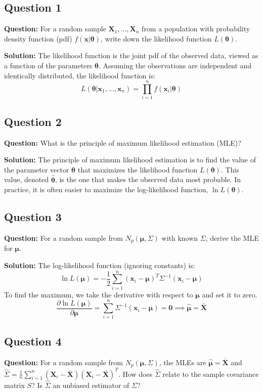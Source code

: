 \subsection*{Question 1}
\textbf{Question:} For a random sample $\mathbf{X}_1, \dots, \mathbf{X}_n$ from a population with probability density function (pdf) $f(\mathbf{x} | \boldsymbol{\theta})$, write down the likelihood function $L(\boldsymbol{\theta})$.

\textbf{Solution:}
The likelihood function is the joint pdf of the observed data, viewed as a function of the parameters $\boldsymbol{\theta}$. Assuming the observations are independent and identically distributed, the likelihood function is:
$$ L(\boldsymbol{\theta} | \mathbf{x}_1, \dots, \mathbf{x}_n) = \prod_{i=1}^n f(\mathbf{x}_i | \boldsymbol{\theta}) $$

\subsection*{Question 2}
\textbf{Question:} What is the principle of maximum likelihood estimation (MLE)?

\textbf{Solution:}
The principle of maximum likelihood estimation is to find the value of the parameter vector $\boldsymbol{\theta}$ that maximizes the likelihood function $L(\boldsymbol{\theta})$. This value, denoted $\hat{\boldsymbol{\theta}}$, is the one that makes the observed data most probable. In practice, it is often easier to maximize the log-likelihood function, $\ln L(\boldsymbol{\theta})$.

\subsection*{Question 3}
\textbf{Question:} For a random sample from $N_p(\boldsymbol{\mu}, \Sigma)$ with known $\Sigma$, derive the MLE for $\boldsymbol{\mu}$.

\textbf{Solution:}
The log-likelihood function (ignoring constants) is:
$$ \ln L(\boldsymbol{\mu}) = -\frac{1}{2} \sum_{i=1}^n (\mathbf{x}_i - \boldsymbol{\mu})^T \Sigma^{-1} (\mathbf{x}_i - \boldsymbol{\mu}) $$
To find the maximum, we take the derivative with respect to $\boldsymbol{\mu}$ and set it to zero.
$$ \frac{\partial \ln L(\boldsymbol{\mu})}{\partial \boldsymbol{\mu}} = \sum_{i=1}^n \Sigma^{-1}(\mathbf{x}_i - \boldsymbol{\mu}) = \mathbf{0} \implies \hat{\boldsymbol{\mu}} = \bar{\mathbf{X}} $$

\subsection*{Question 4}
\textbf{Question:} For a random sample from $N_p(\boldsymbol{\mu}, \Sigma)$, the MLEs are $\hat{\boldsymbol{\mu}} = \bar{\mathbf{X}}$ and $\hat{\Sigma} = \frac{1}{n}\sum_{i=1}^n(\mathbf{X}_i-\bar{\mathbf{X}})(\mathbf{X}_i-\bar{\mathbf{X}})^T$. How does $\hat{\Sigma}$ relate to the sample covariance matrix $S$? Is $\hat{\Sigma}$ an unbiased estimator of $\Sigma$?

